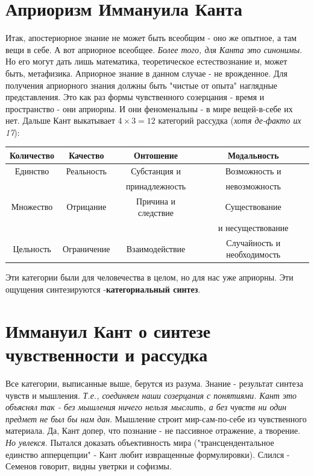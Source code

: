 \section{Априоризм Иммануила Канта}
Итак, апостериорное знание не может быть всеобщим - оно же опытное, а там вещи в себе. А вот априорное всеобщее. \textit{Более того, для Канта это синонимы}. Но его могут дать лишь математика, теоретическое естествознание и, может быть, метафизика. Априорное знание в данном случае - не врожденное. Для получения априорного знания должны быть "чистые от опыта" наглядные представления. Это как раз формы чувственного созерцания - время и пространство - они априорны. И они феноменальны - в мире вещей-в-себе их нет. Дальше Кант выкатывает $4\times3=12$ категорий рассудка (\textit{хотя де-факто их 17}): 

\begin{tabular}{|c|c|c|c|}
\hline
\textbf{Количество}& \textbf{Качество}& \textbf{Онтошение}& \textbf{Модальность}\\
\hline
Единство&Реальность&Субстанция и &Возможность и\\
&&принадлежность& невозможность\\
\hline
Множество&Отрицание&Причина и следствие&Существование \\&&&и несуществование\\
\hline
Цельность&Ограничение&Взаимодействие&Случайность и необходимость\\
\hline
\end{tabular}

Эти категории были  для человечества в целом, но для нас уже априорны. Эти ощущения синтезируются -\textbf{категориальный синтез}.

\section{Иммануил Кант о синтезе чувственности и рассудка}
Все категории, выписанные выше, берутся из разума. 
Знание - результат синтеза чувств и мышления. \textit{Т.е., соединяем наши созерцания с понятиями. Кант это объяснял так - без мышления ничего нельзя мыслить, а без чувств ни один предмет не был бы нам дан}. Мышление строит мир-сам-по-себе из чувственного материала. Да, Кант допер, что познание - не пассивное отражение, а творение. \textit{Но увлекся}. Пытался доказать объективность мира ("трансцендентальное единство апперцепции" - Кант любит извращенные формулировки). Слился  - Семенов говорит, видны уветрки и софизмы.

